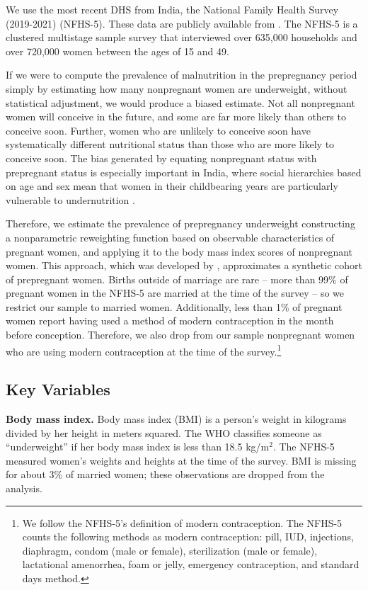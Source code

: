 \documentclass[12pt]{article}
\begin{document}
We use the most recent DHS from India, the National Family Health Survey (2019-2021) (NFHS-5). These data are publicly available from .  The NFHS-5 is a clustered multistage sample survey that interviewed over 635,000 households and over 720,000 women between the ages of 15 and 49.

If we were to compute the prevalence of malnutrition in the prepregnancy period simply by estimating how many nonpregnant women are underweight, without statistical adjustment, we would produce a biased estimate.  Not all nonpregnant women will conceive in the future, and some are far more likely than others to conceive soon.  Further, women who are unlikely to conceive soon have systematically different nutritional status than those who are more likely to conceive soon. The bias generated by equating nonpregnant status with prepregnant status is especially important in India, where social hierarchies based on age and sex mean that women in their childbearing years are particularly vulnerable to undernutrition \citep{gupta1995life, coffey2021neonatal}.  

Therefore, we estimate the prevalence of prepregnancy underweight constructing a nonparametric reweighting function based on observable characteristics of pregnant women, and applying it to the body mass index scores of nonpregnant women.  This approach, which was developed by \cite{coffey2015prepregnancy}, approximates a synthetic cohort of prepregnant women.  Births outside of marriage are rare -- more than 99\% of pregnant women in the NFHS-5 are married at the time of the survey -- so we restrict our sample to married women. Additionally, less than 1\% of pregnant women report having used a method of modern contraception in the month before conception. Therefore, we also drop from our sample nonpregnant women who are using modern contraception at the time of the survey.\footnote{We follow the NFHS-5's definition of modern contraception.  The NFHS-5 counts the following methods as modern contraception: pill, IUD, injections, diaphragm, condom (male or female), sterilization (male or female), lactational amenorrhea, foam or jelly, emergency contraception, and standard days method.} 

\subsection{Key Variables}

{\bf{Body mass index.}} Body mass index (BMI) is a person's weight in kilograms divided by her height in meters squared.  The WHO classifies someone as ``underweight'' if her body mass index is less than 18.5 kg/m$^2$.  The NFHS-5 measured women's weights and heights at the time of the survey.  BMI is missing for about 3\% of married women; these observations are dropped from the analysis.
\end{document}
